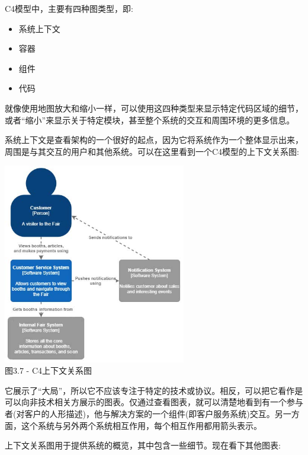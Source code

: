 C4模型中，主要有四种图类型，即:

\begin{itemize}
\item
系统上下文

\item 
容器

\item
组件

\item
代码
\end{itemize}

就像使用地图放大和缩小一样，可以使用这四种类型来显示特定代码区域的细节，或者“缩小”来显示关于特定模块，甚至整个系统的交互和周围环境的更多信息。

系统上下文是查看架构的一个很好的起点，因为它将系统作为一个整体显示出来，周围是与其交互的用户和其他系统。可以在这里看到一个C4模型的上下文关系图:

\begin{center}
\includegraphics[width=0.6\textwidth]{content/1/chapter3/images/7.jpg}\\
图3.7 - C4上下文关系图
\end{center}

它展示了“大局”，所以它不应该专注于特定的技术或协议。相反，可以把它看作是可以向非技术相关方展示的图表。仅通过查看图表，就可以清楚地看到有一个参与者(对客户的人形描述)，他与解决方案的一个组件(即客户服务系统)交互。另一方面，这个系统与另外两个系统相互作用，每个相互作用都用箭头表示。

上下文关系图用于提供系统的概览，其中包含一些细节。现在看下其他图表:

